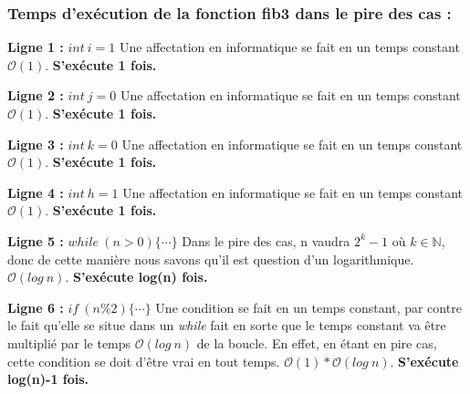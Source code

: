 \documentclass[12pt]{article}
\begin{document}
	  \newpage      
      
      \subsubsection*{Temps d'exécution de la fonction fib3 dans le pire des cas :}
  	    
  	    \noindent \textbf{Ligne 1 :} \( int \: i = 1 \) \newline
        Une affectation en informatique se fait en un temps constant
        \( \mathcal{O}(1) \). \newline
        \textbf{S'exécute 1 fois.} \newline

        \noindent \textbf{Ligne 2 :} \( int \: j = 0 \) \newline
        Une affectation en informatique se fait en un temps constant
        \( \mathcal{O}(1) \). \newline
        \textbf{S'exécute 1 fois.} \newline      
        
        \noindent \textbf{Ligne 3 :} \( int \: k = 0 \) \newline
        Une affectation en informatique se fait en un temps constant
        \( \mathcal{O}(1) \). \newline
 		\textbf{S'exécute 1 fois.} \newline       
        
        \noindent \textbf{Ligne 4 :} \( int \: h = 1 \) \newline
        Une affectation en informatique se fait en un temps constant
        \( \mathcal{O}(1) \). \newline
		\textbf{S'exécute 1 fois.} \newline     
        
        \noindent \textbf{Ligne 5 :} \( while \: (n>0) \{ \cdots \} \) \newline
        Dans le pire des cas, n vaudra \( 2^k - 1 \) où \(k \in \mathbb{N} \), donc de cette manière nous         savons qu'il est question d'un logarithmique. 
        \( \mathcal{O}(log \: n) \). \newline
		\textbf{S'exécute log(n) fois.} \newline

        \noindent \textbf{Ligne 6 :}  \( if \: (n\%2)\{ \cdots \} \) \newline
        Une condition se fait en un temps constant, par contre le fait qu'elle se situe dans un \textit{while} fait en sorte que le temps constant va être multiplié par le temps \( \mathcal{O}(log \: n) \) de la boucle. En effet, en étant en pire cas, cette condition se doit d'être vrai en tout temps.
        \( \mathcal{O}(1)*\mathcal{O}(log \: n) \). \newline
		\textbf{S'exécute log(n)-1 fois.} \newline
		
\end{document}
